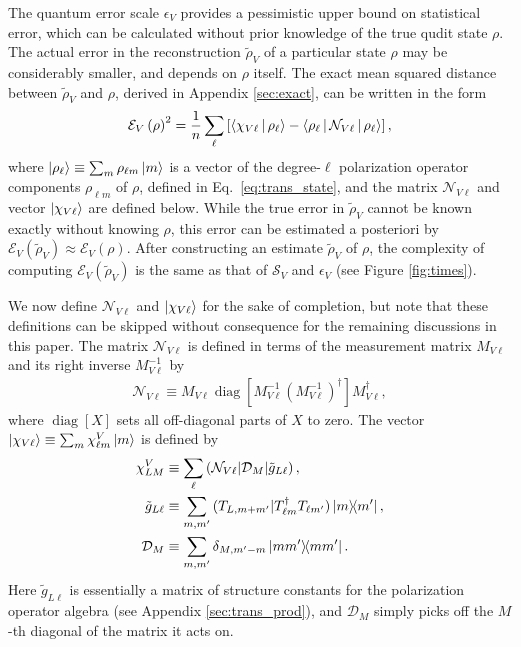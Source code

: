 \documentclass[notitlepage,twocolumn]{revtex4-2}
\newcommand{\f}[2]{\dfrac{#1}{#2}} %
\newcommand{\p}[1]{\left(#1\right)} %
\renewcommand{\sp}[1]{\left[#1\right]} %
\newcommand{\bk}{\Braket} %
\newcommand{\D}{\mathcal{D}}
\newcommand{\E}{\mathcal{E}}
\newcommand{\N}{\mathcal{N}}
\renewcommand{\S}{\mathcal{S}}
\def\obk#1{\mathinner{({#1})}}
\DeclareMathOperator{\diag}{diag}
\begin{document}
The quantum error scale $\epsilon_V$ provides a pessimistic upper bound on statistical error, which can be calculated without prior knowledge of the true qudit state $\rho$.
The actual error in the reconstruction $\tilde\rho_V$ of a particular state $\rho$ may be considerably smaller, and depends on $\rho$ itself.
The exact mean squared distance between $\tilde\rho_V$ and $\rho$, derived in Appendix \ref{sec:exact}, can be written in the form
\begin{align}
  \E_V\p{\rho}^2
  = \f1n \sum_\ell \sp{\bk{\chi_{V\ell}|\rho_\ell}
    - \bk{\rho_\ell|\N_{V\ell}|\rho_\ell}},
  \label{eq:error}
\end{align}
where $\ket{\rho_\ell} \equiv \sum_m \rho_{\ell m}\ket{m}$ is a vector of the degree-$\ell$ polarization operator components $\rho_{\ell m}$ of $\rho$, defined in Eq.~\eqref{eq:trans_state}, and the matrix $\N_{V\ell}$ and vector $\ket{\chi_{V\ell}}$ are defined below.
While the true error in $\tilde\rho_V$ cannot be known exactly without knowing $\rho$, this error can be estimated a posteriori by $\E_V\p{\tilde\rho_V} \approx \E_V\p{\rho}$.
After constructing an estimate $\tilde\rho_V$ of $\rho$, the complexity of computing $\E_V\p{\tilde\rho_V}$ is the same as that of $\S_V$ and $\epsilon_V$ (see Figure \ref{fig:times}).

We now define $\N_{V\ell}$ and $\ket{\chi_{V\ell}}$ for the sake of completion, but note that these definitions can be skipped without consequence for the remaining discussions in this paper.
The matrix $\N_{V\ell}$ is defined in terms of the measurement matrix $M_{V\ell}$ and its right inverse $M_{V\ell}^{-1}$ by
\begin{align}
  \N_{V\ell} \equiv M_{V\ell} \diag\sp{M_{V\ell}^{-1}
    \p{M_{V\ell}^{-1}}^\dag} M_{V\ell}^\dag,
\end{align}
where $\diag\sp{X}$ sets all off-diagonal parts of $X$ to zero.
The vector $\ket{\chi_{V\ell}}\equiv\sum_m \chi^V_{\ell m} \ket{m}$ is defined by
\begin{align}
  \chi^V_{LM} &\equiv
  \sum_\ell \obk{\N_{V\ell}|\D_M|\tilde g_{L\ell}}, \\
  \tilde g_{L\ell} &\equiv \sum_{m,m'}
  \obk{T_{L,m+m'}|T_{\ell m}^\dag T_{\ell m'}} \op{m}{m'}, \\
  \D_M &\equiv \sum_{m,m'} \delta_{M,m'-m} \op{mm'}.
\end{align}
Here $\tilde g_{L\ell}$ is essentially a matrix of structure constants for the polarization operator algebra (see Appendix \ref{sec:trans_prod}), and $\D_M$ simply picks off the $M$-th diagonal of the matrix it acts on.
\end{document}
